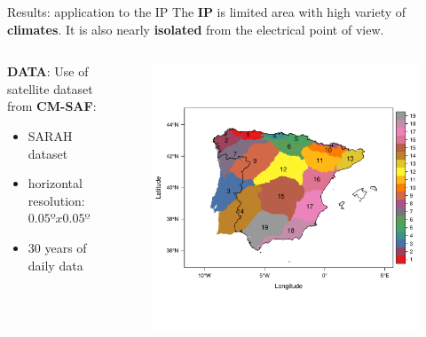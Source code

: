 \documentclass{beamer}%
\begin{document}
\begin{frame}[fragile]{Results: application to the IP}
  The \textbf{\alert{IP}} is limited area with high variety of \textbf{climates}. It is also nearly \textbf{isolated} from the electrical point of view.
  \begin{columns}
    \begin{column}{0.5\textwidth}
  \textbf{DATA}:    
  Use of satellite dataset from \textbf{\alert{CM-SAF}}:
  \begin{itemize}
  \item SARAH dataset
  \item horizontal resolution: $0.05ºx 0.05º$
  \item 30 years of daily data
  \end{itemize}   
    \end{column}
    \begin{column}{0.5\textwidth}
      \begin{figure}
\includegraphics[scale=0.3]{clusters2.pdf}
      \end{figure}
    \end{column}
  \end{columns}
\end{frame}
\end{document}
